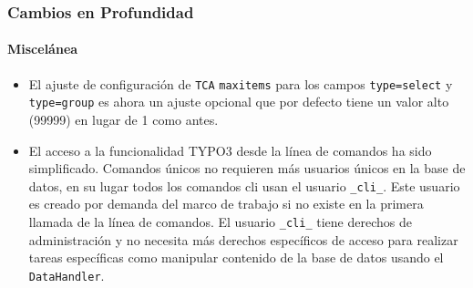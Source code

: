 \begin{frame}[fragile]
	\frametitle{Cambios en Profundidad}
	\framesubtitle{Miscelánea}

	\begin{itemize}
		\item El ajuste de configuración de \texttt{TCA} \texttt{maxitems} para los campos \texttt{type=select} y \texttt{type=group}
			es ahora un ajuste opcional que por defecto tiene un valor alto (99999) en lugar de 1 como antes.

		\item El acceso a la funcionalidad TYPO3 desde la línea de comandos ha sido simplificado. Comandos únicos no requieren más
			usuarios únicos en la base de datos, en su lugar todos los comandos cli usan el usuario \texttt{\_cli\_}.
			Este usuario es creado por demanda del marco de trabajo si no existe en la primera llamada de la línea de comandos.
			El usuario \texttt{\_cli\_} tiene derechos de administración y no necesita más derechos específicos de acceso para
			realizar tareas específicas como manipular contenido de la base de datos usando el \texttt{DataHandler}.

	\end{itemize}

\end{frame}


